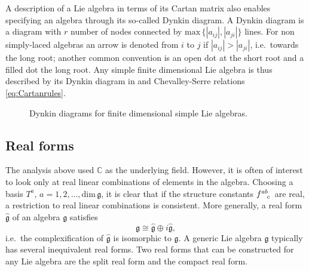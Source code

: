 A description of a Lie algebra in terms of its Cartan matrix also enables specifying an algebra through its so-called Dynkin diagram. A Dynkin diagram is a diagram with $r$ number of nodes connected by $\text{max}\,\{|a_{ij}|,|a_{ji}|\}$ lines. For non simply-laced algebras an arrow is denoted from $i$ to $j$ if $|a_{ij}|>|a_{ji}|$, i.e.\ towards the long root; another common convention is an open dot at the short root and a filled dot the long root. Any simple finite dimensional Lie algebra is thus described by its Dynkin diagram in  and Chevalley-Serre relations \eqref{eq:Cartanrules}.
\begin{figure}
    \centering
    \AllDynkin
    \caption{Dynkin diagrams for finite dimensional simple Lie algebras.}
    \label{fig:AllDynkin}
\end{figure}



\subsection{Real forms}\label{sec:Realforms}
The analysis above used $\mathbb{C}$ as the underlying field. However, it is often of interest to look only at real linear combinations of elements in the algebra. Choosing a basis $T^a$, $a=1,2,\ldots, \text{dim}\,\mathfrak{g}$, it is clear that if the structure constants $\tensor{f}{^{ab}_c}$ are real, a restriction to real linear combinations is consistent. More generally, a real form $\hat{\mathfrak{g}}$ of an algebra $\mathfrak{g}$ satisfies
\begin{equation}
    \mathfrak{g} \cong \hat{\mathfrak{g}}\oplus i\hat{\mathfrak{g}},
\end{equation}
i.e.\ the complexification of $\hat{\mathfrak{g}}$ is isomorphic to $\mathfrak{g}$. A generic Lie algebra $\mathfrak{g}$ typically has several inequivalent real forms. Two real forms that can be constructed for any Lie algebra are the split real form and the compact real form.

